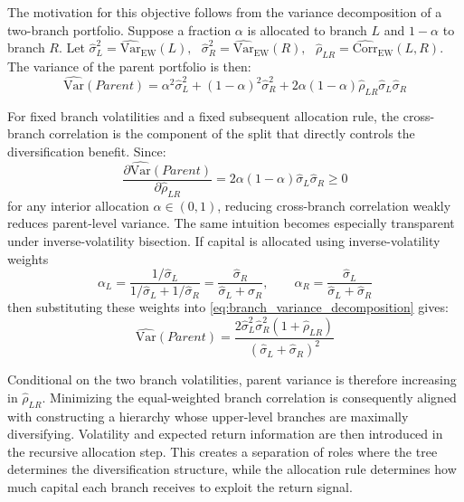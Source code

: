 \documentclass[12pt]{article}
\begin{document}
The motivation for this objective follows from the variance decomposition of a two-branch portfolio. Suppose a fraction $\alpha$ is allocated to branch $L$ and $1-\alpha$ to branch $R$. Let
$
\hat{\sigma}_L^2=\widehat{\mathrm{Var}}_{\mathrm{EW}}(L), \text{ }
\hat{\sigma}_R^2=\widehat{\mathrm{Var}}_{\mathrm{EW}}(R), \text{ }
\hat{\rho}_{LR}=\widehat{\mathrm{Corr}}_{\mathrm{EW}}(L,R).
$
The variance of the parent portfolio is then:
\begin{equation}
\widehat{\mathrm{Var}}(Parent)
=
\alpha^2 \hat{\sigma}_L^2
+
(1-\alpha)^2 \hat{\sigma}_R^2
+
2\alpha(1-\alpha)\hat{\rho}_{LR}\hat{\sigma}_L\hat{\sigma}_R
\label{eq:branch_variance_decomposition}
\end{equation}

For fixed branch volatilities and a fixed subsequent allocation rule, the cross-branch correlation is the component of the split that directly controls the diversification benefit. Since:
\begin{equation}
\frac{
\partial \widehat{\mathrm{Var}}(Parent)
}{
\partial \hat{\rho}_{LR}
}
=
2\alpha(1-\alpha)\hat{\sigma}_L\hat{\sigma}_R
\geq 0
\label{eq:variance_corr_derivative}
\end{equation}
for any interior allocation $\alpha\in(0,1)$, reducing cross-branch correlation weakly reduces parent-level variance. The same intuition becomes especially transparent under inverse-volatility bisection. If capital is allocated using inverse-volatility weights
\[
\alpha_L
=
\frac{1/\hat{\sigma}_L}{1/\hat{\sigma}_L+1/\hat{\sigma}_R}
=
\frac{\hat{\sigma}_R}{\hat{\sigma}_L+\hat{\sigma}_R},
\qquad
\alpha_R
=
\frac{\hat{\sigma}_L}{\hat{\sigma}_L+\hat{\sigma}_R}
\]
then substituting these weights into \eqref{eq:branch_variance_decomposition} gives:
\begin{equation}
\widehat{\mathrm{Var}}(Parent)
=
\frac{
2\hat{\sigma}_L^2\hat{\sigma}_R^2(1+\hat{\rho}_{LR})
}{
(\hat{\sigma}_L+\hat{\sigma}_R)^2
}
\label{eq:ivp_variance_correlation}
\end{equation}

Conditional on the two branch volatilities, parent variance is therefore increasing in $\hat{\rho}_{LR}$. Minimizing the equal-weighted branch correlation is consequently aligned with constructing a hierarchy whose upper-level branches are maximally diversifying. Volatility and expected return information are then introduced in the recursive allocation step. This creates a separation of roles where the tree determines the diversification structure, while the allocation rule determines how much capital each branch receives to exploit the return signal.
\end{document}
